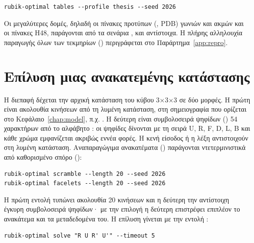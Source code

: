 \begin{verbatim}
rubik-optimal tables --profile thesis --seed 2026
\end{verbatim}

Οι μεγαλύτερες δομές, δηλαδή οι πίνακες προτύπων (, PDB) γωνιών και ακμών και οι πίνακες H48, παράγονται από τα σενάρια ,  και  αντίστοιχα. Η πλήρης αλληλουχία παραγωγής όλων των τεκμηρίων () περιγράφεται στο Παράρτημα~\ref{app:repro}.

\section{Επίλυση μιας ανακατεμένης κατάστασης}
\label{sec:usage-solve}

Η διεπαφή δέχεται την αρχική κατάσταση του κύβου 3×3×3 σε δύο μορφές. Η πρώτη είναι ακολουθία κινήσεων από τη λυμένη κατάσταση, στη σημειογραφία που ορίζεται στο Κεφάλαιο~\ref{chap:model}, π.χ. . Η δεύτερη είναι συμβολοσειρά ψηφίδων () 54 χαρακτήρων από το αλφάβητο : οι ψηφίδες δίνονται με τη σειρά U, R, F, D, L, B και κάθε χρώμα εμφανίζεται ακριβώς εννέα φορές. Η κενή είσοδος ή η λέξη  αντιστοιχούν στη λυμένη κατάσταση. Αναπαραγώγιμα ανακατέματα () παράγονται ντετερμινιστικά από καθορισμένο σπόρο ():

\begin{verbatim}
rubik-optimal scramble --length 20 --seed 2026
rubik-optimal facelets --length 20 --seed 2026
\end{verbatim}

Η πρώτη εντολή τυπώνει ακολουθία 20 κινήσεων και η δεύτερη την αντίστοιχη έγκυρη συμβολοσειρά ψηφίδων· με την επιλογή  η δεύτερη επιστρέφει επιπλέον το ανακάτεμα και τα μεταδεδομένα του. Η επίλυση γίνεται με την εντολή :

\begin{verbatim}
rubik-optimal solve "R U R' U'" --timeout 5
\end{verbatim}

